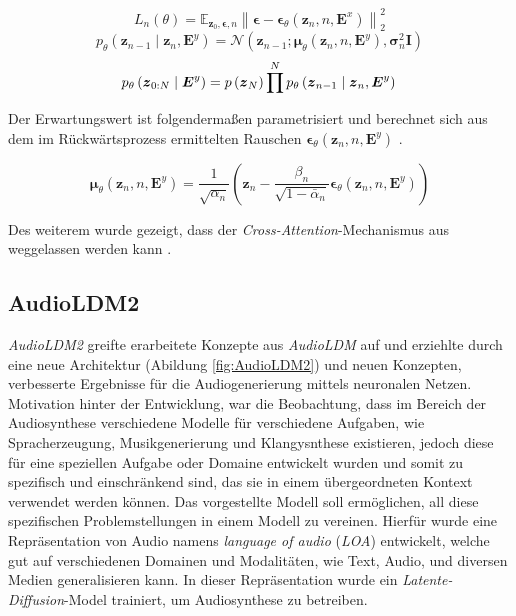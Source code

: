 \documentclass[
  a4paper,  %
  twoside,  %
  bibliography=totoc,
  headsepline,
  cleardoublepage=empty,
  parskip=half,
  draft=false
]{scrbook}
\begin{document}
\begin{equation}
    L_n(\theta)=\mathbb{E}_{\boldsymbol{z}_0, \boldsymbol{\epsilon}, n}\left\|\boldsymbol{\epsilon}-\boldsymbol{\epsilon}_\theta\left(\boldsymbol{z}_n, n, \boldsymbol{E}^x\right)\right\|_2^2
\end{equation}
\begin{equation}
    p_\theta\left(\boldsymbol{z}_{n-1} \mid \boldsymbol{z}_n, \boldsymbol{E}^y\right)=\mathcal{N}\left(\boldsymbol{z}_{n-1} ; \boldsymbol{\mu}_\theta\left(\boldsymbol{z}_n, n, \boldsymbol{E}^y\right), \boldsymbol{\sigma}_n^2 \boldsymbol{I}\right)
\end{equation}
\begin{equation}
    p_\theta\left(\boldsymbol{z}_{0: N} \mid \boldsymbol{E}^y\right)=p\left(\boldsymbol{z}_N\right) \prod^N p_\theta\left(\boldsymbol{z}_{n-1} \mid \boldsymbol{z}_n, \boldsymbol{E}^y\right) \\
\end{equation}

Der Erwartungswert ist folgendermaßen parametrisiert und berechnet sich aus dem im Rückwärtsprozess ermittelten Rauschen $\boldsymbol{\epsilon}_\theta\left(\boldsymbol{z}_n, n, \boldsymbol{E}^y\right)$ \cite{liu_audioldm_2023}.

\begin{equation}
    \boldsymbol{\mu}_\theta\left(\boldsymbol{z}_n, n, \boldsymbol{E}^y\right)=\frac{1}{\sqrt{\alpha_n}}\left(\boldsymbol{z}_n-\frac{\beta_n}{\sqrt{1-\bar{\alpha}_n}} \boldsymbol{\epsilon}_\theta\left(\boldsymbol{z}_n, n, \boldsymbol{E}^y\right)\right)
\end{equation}

Des weiterem wurde gezeigt, dass der \emph{Cross-Attention}-Mechanismus aus \cite{rombach_high-resolution_2022} weggelassen werden kann \cite{liu_audioldm_2023}. 

\subsection{AudioLDM2}

\emph{AudioLDM2}\cite{liu_audioldm2_2023} greifte erarbeitete Konzepte aus \emph{AudioLDM}\cite{liu_audioldm_2023} auf und erziehlte durch eine neue Architektur (Abildung \ref{fig:AudioLDM2}) und neuen Konzepten, verbesserte Ergebnisse für die Audiogenerierung mittels neuronalen Netzen. Motivation hinter der Entwicklung, war die Beobachtung, dass im Bereich der Audiosynthese verschiedene Modelle für verschiedene Aufgaben, wie Spracherzeugung, Musikgenerierung und Klangysnthese existieren, jedoch diese für eine speziellen Aufgabe oder Domaine entwickelt wurden und somit zu spezifisch und einschränkend sind, das sie in einem übergeordneten Kontext verwendet werden können. Das vorgestellte Modell soll ermöglichen, all diese spezifischen Problemstellungen in einem Modell zu vereinen. Hierfür wurde eine Repräsentation von Audio namens \emph{language of audio} (\emph{LOA}) entwickelt, welche gut auf verschiedenen Domainen und Modalitäten, wie Text, Audio, und diversen Medien generalisieren kann. In dieser Repräsentation wurde ein \emph{Latente-Diffusion}-Model trainiert, um Audiosynthese zu betreiben. \cite{liu_audioldm2_2023}
\end{document}
